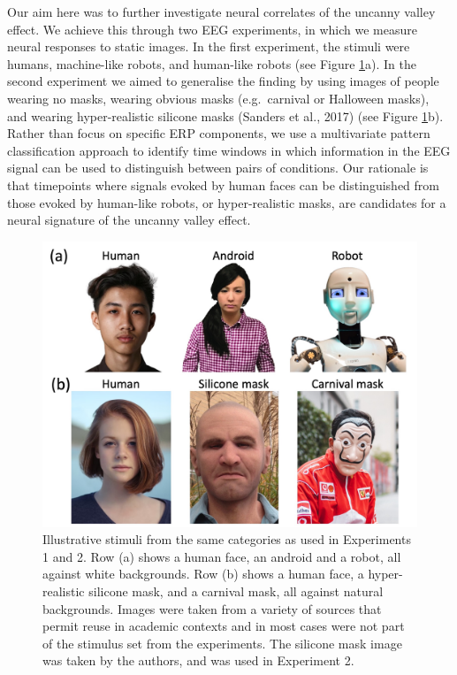 \documentclass[
]{article}
\begin{document}
Our aim here was to further investigate neural correlates of the uncanny valley effect. We achieve this through two EEG experiments, in which we measure neural responses to static images. In the first experiment, the stimuli were humans, machine-like robots, and human-like robots (see Figure \ref{fig:stimexamples}a). In the second experiment we aimed to generalise the finding by using images of people wearing no masks, wearing obvious masks (e.g.~carnival or Halloween masks), and wearing hyper-realistic silicone masks (Sanders et al., 2017) (see Figure \ref{fig:stimexamples}b). Rather than focus on specific ERP components, we use a multivariate pattern classification approach to identify time windows in which information in the EEG signal can be used to distinguish between pairs of conditions. Our rationale is that timepoints where signals evoked by human faces can be distinguished from those evoked by human-like robots, or hyper-realistic masks, are candidates for a neural signature of the uncanny valley effect.

\begin{figure}

{\centering \includegraphics[width=0.8\linewidth]{Figures/stimfigure} 

}

\caption{Illustrative stimuli from the same categories as used in Experiments 1 and 2. Row (a) shows a human face, an android and a robot, all against white backgrounds. Row (b) shows a human face, a hyper-realistic silicone mask, and a carnival mask, all against natural backgrounds. Images were taken from a variety of sources that permit reuse in academic contexts and in most cases were not part of the stimulus set from the experiments. The silicone mask image was taken by the authors, and was used in Experiment 2.}\label{fig:stimexamples}
\end{figure}
\end{document}
